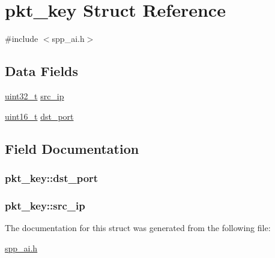 \hypertarget{structpkt__key}{
\section{pkt\_\-key Struct Reference}
\label{structpkt__key}
}


{\ttfamily \#include $<$spp\_\-ai.h$>$}

\subsection*{Data Fields}
\begin{DoxyCompactItemize}
\item 
\hyperlink{spp__ai_8h_a435d1572bf3f880d55459d9805097f62}{uint32\_\-t} \hyperlink{structpkt__key_a3a091c20dafb8b3f689db00c5b2f8ddb}{src\_\-ip}
\item 
\hyperlink{spp__ai_8h_a273cf69d639a59973b6019625df33e30}{uint16\_\-t} \hyperlink{structpkt__key_af77f5eb1f4cd88b43fe99fd73553351d}{dst\_\-port}
\end{DoxyCompactItemize}


\subsection{Field Documentation}
\hypertarget{structpkt__key_af77f5eb1f4cd88b43fe99fd73553351d}{
\subsubsection[{dst\_\-port}]{ {\bf pkt\_\-key::dst\_\-port}}}
\label{structpkt__key_af77f5eb1f4cd88b43fe99fd73553351d}
\hypertarget{structpkt__key_a3a091c20dafb8b3f689db00c5b2f8ddb}{
\subsubsection[{src\_\-ip}]{ {\bf pkt\_\-key::src\_\-ip}}}
\label{structpkt__key_a3a091c20dafb8b3f689db00c5b2f8ddb}


The documentation for this struct was generated from the following file:\begin{DoxyCompactItemize}
\item 
\hyperlink{spp__ai_8h}{spp\_\-ai.h}\end{DoxyCompactItemize}
